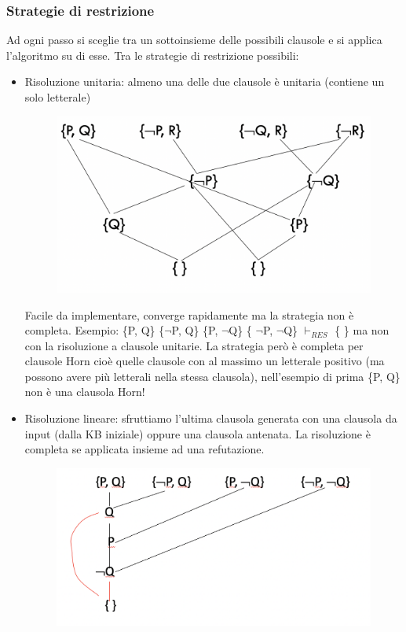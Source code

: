 \documentclass{article}
\begin{document}
\subsubsection{Strategie di restrizione}
Ad ogni passo si sceglie tra un sottoinsieme delle possibili clausole e si applica l'algoritmo su di esse. Tra le strategie di restrizione possibili:
\begin{itemize}
    \item Risoluzione unitaria: almeno una delle due clausole è unitaria (contiene un solo letterale)
        \begin{figure}[H]
        \centering
        \includegraphics[scale=0.4]{Images/risoluzioneunitaria.png}
        \end{figure}
        Facile da implementare, converge rapidamente ma la strategia non è completa. \newline 
        Esempio: \{P, Q\} \{$\neg$P, Q\} \{P, $\neg$Q\} \{ $\neg$P, $\neg$Q\} $\vdash _{RES}$ \{ \} ma non con la risoluzione a clausole unitarie. \newline
        La strategia però è completa per clausole Horn cioè quelle clausole con al massimo un letterale positivo (ma possono avere più letterali nella stessa clausola), nell'esempio di prima \{P, Q\} non è una clausola Horn!
    \item Risoluzione lineare: sfruttiamo l'ultima clausola generata con una clausola da input (dalla KB iniziale) oppure una clausola antenata. La risoluzione è completa se applicata insieme ad una refutazione.
        \begin{figure}[H]
        \centering
        \includegraphics[scale=0.4]{Images/risoluzionelineare.png}

\end{figure}
\end{itemize}
\end{document}
